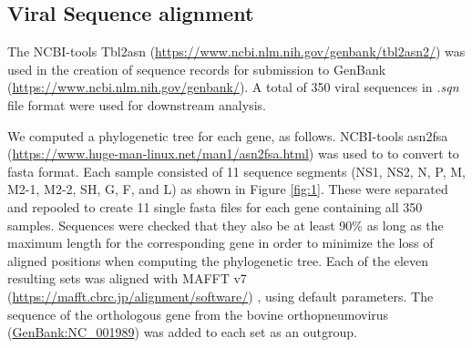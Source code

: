 \documentclass{article} %
\begin{document}
\subsection{Viral Sequence alignment}
The NCBI-tools Tbl2asn (\url{https://www.ncbi.nlm.nih.gov/genbank/tbl2asn2/})
was used in the creation of sequence records for submission to GenBank (\url{https://www.ncbi.nlm.nih.gov/genbank/}).
A total of 350 viral sequences in \textit{.sqn} file format were used for downstream analysis.

We computed a phylogenetic tree for each gene, as follows.
NCBI-tools asn2fsa (\url{https://www.huge-man-linux.net/man1/asn2fsa.html}) was used to to convert to fasta format.
Each sample consisted of 11 sequence segments
(NS1, NS2, N, P, M, M2-1, M2-2, SH, G, F, and L) as shown in 
Figure \ref{fig:1}.
These were separated and repooled to create 11 single fasta files for each gene containing all 350 samples. 
Sequences were checked that they also be at least 90\% as long as the maximum length 
for the corresponding gene in order to minimize the loss of aligned positions when computing the phylogenetic tree. 
Each of the eleven resulting sets was aligned with MAFFT v7 (\url{https://mafft.cbrc.jp/alignment/software/})
\cite{katoh2013mafft},
using default  parameters.
The sequence of the orthologous gene from the bovine orthopneumovirus 
(\href{https://www.ncbi.nlm.nih.gov/nuccore/NC_001989}{GenBank:NC\_001989}) 
was added to each set as an outgroup. 
\end{document}
